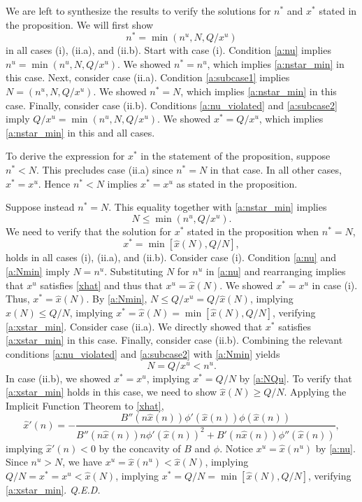 \documentclass[12pt]{article}
\newcommand{\efficacy}{\phi}
\newcommand{\xh}{\hat{x}}
\newcommand{\benefit}{B}
\renewcommand{\qed}{{\it Q.E.D.}}
\begin{document}
We are left to synthesize the results to verify the solutions for $n^*$ and $x^*$ stated in the proposition. We will first show 
\begin{equation}
\label{a:nstar_min}
n^* = \min(n^u, N, Q/x^u)
\end{equation}
in all cases (i), (ii.a), and (ii.b). Start with case (i). Condition \eqref{a:nu} implies $n^u = \min (n^u, N, Q/x^u)$. We showed $n^* = n^u$, which implies \eqref{a:nstar_min} in this case. Next, consider case (ii.a). Condition \eqref{a:subcase1} implies $N = (n^u, N, Q/x^u)$. We showed $n^* = N$, which implies \eqref{a:nstar_min} in this case. Finally, consider case (ii.b). Conditions \eqref{a:nu_violated} and \eqref{a:subcase2} imply $Q/x^u = \min(n^u, N, Q/x^u)$. We showed $x^* = Q/x^u$, which implies \eqref{a:nstar_min} in this and all cases.  

To derive the expression for $x^*$ in the statement of the proposition, suppose $n^* < N$. This precludes case (ii.a) since $n^* = N$ in that case. In all other cases, $x^* = x^u$. Hence $n^* < N$ implies $x^* = x^u$ as stated in the proposition. 

Suppose instead $n^* = N$. This equality together with \eqref{a:nstar_min} implies 
\begin{equation}
\label{a:Nmin}
N \leq \min(n^u, Q/x^u).
\end{equation}
We need to verify that the solution for $x^*$ stated in the proposition when $n^* = N$, 
\begin{equation}
\label{a:xstar_min}
x^* = \min[\xh(N), Q/N],
\end{equation}
holds in all cases (i), (ii.a), and (ii.b). 
Consider case (i). 
Condition \eqref{a:nu} and \eqref{a:Nmin} imply $N = n^u$. Substituting $N$ for $n^u$ in \eqref{a:nu} and rearranging implies that $x^u$ satisfies \eqref{xhat} and thus that $x^u = \xh(N)$. We showed $x^* = x^u$ in case (i). Thus, $x^* = \xh(N)$. By \eqref{a:Nmin}, $N \leq Q / x^u = Q / \xh(N)$, implying $\xh(N) \leq Q/N$, implying $x^* = \xh(N) = \min[\xh(N), Q/N]$, verifying \eqref{a:xstar_min}. Consider case (ii.a). We directly showed that $x^*$ satisfies \eqref{a:xstar_min} in this case. Finally, consider case (ii.b). Combining the relevant conditions \eqref{a:nu_violated} and \eqref{a:subcase2} with \eqref{a:Nmin} yields 
\begin{equation}
\label{a:NQu}
N = Q/x^u < n^u.
\end{equation}
In case (ii.b), we showed $x^* = x^u$, implying $x^* = Q/N$ by \eqref{a:NQu}. To verify that \eqref{a:xstar_min} holds in this case, we need to show $\xh(N) \geq Q/N$. Applying the Implicit Function Theorem to \eqref{xhat},
\begin{equation}
\label{a:implicit}
\xh'(n) = - \frac{\benefit''(n \xh(n)) \efficacy'(\xh(n)) \efficacy(\xh(n))}{\benefit''(n \xh(n)) n \efficacy'(\xh(n))^2 + \benefit'(n \xh(n)) \efficacy''(\xh(n))},
\end{equation}
implying $\xh'(n) < 0$ by the concavity of $\benefit$ and $\efficacy$. Notice $x^u = \xh(n^u)$ by \eqref{a:nu}. Since $n^u > N$, we have $x^u = \xh(n^u) < \xh(N)$, implying $Q/N = x^* = x^u < \xh(N)$, implying $x^* = Q/N = \min[\xh(N), Q/N]$, verifying \eqref{a:xstar_min}. \qed
\end{document}
